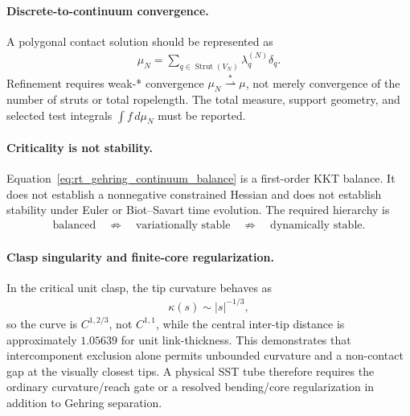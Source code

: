     \paragraph{Discrete-to-continuum convergence.}
    A polygonal contact solution should be represented as
    \begin{align}
        \mu_N
        =
        \sum_{q\in\operatorname{Strut}(V_N)}
        \lambda_q^{(N)}\delta_q.
        \label{eq:rt_discrete_contact_measure}
    \end{align}
    Refinement requires weak-* convergence \(\mu_N\overset{*}{\rightharpoonup}\mu\),
    not merely convergence of the number of struts or total ropelength.  The total
    measure, support geometry, and selected test integrals \(\int f\,d\mu_N\) must be
    reported.

    \paragraph{Criticality is not stability.}
    Equation~\eqref{eq:rt_gehring_continuum_balance} is a first-order KKT balance.
    It does not establish a nonnegative constrained Hessian and does not establish
    stability under Euler or Biot--Savart time evolution.  The required hierarchy is
    \begin{align}
        \text{balanced}
        \quad\not\Rightarrow\quad
        \text{variationally stable}
        \quad\not\Rightarrow\quad
        \text{dynamically stable}.
        \label{eq:rt_gehring_stability_hierarchy}
    \end{align}

    \paragraph{Clasp singularity and finite-core regularization.}
    In the critical unit clasp, the tip curvature behaves as
    \begin{align}
        \kappa(s)
        \sim
        |s|^{-1/3},
        \label{eq:rt_gehring_clasp_curvature}
    \end{align}
    so the curve is \(C^{1,2/3}\), not \(C^{1,1}\), while the central inter-tip
    distance is approximately \(1.05639\) for unit link-thickness.  This demonstrates
    that intercomponent exclusion alone permits unbounded curvature and a non-contact
    gap at the visually closest tips.  A physical SST tube therefore requires the
    ordinary curvature/reach gate or a resolved bending/core regularization in
    addition to Gehring separation.

